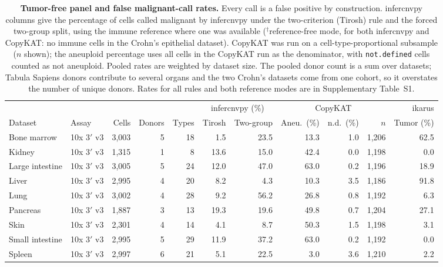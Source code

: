 \begin{table}[htbp]
\centering
\caption{\textbf{Tumor-free panel and false malignant-call rates.} Every call is a false positive by construction. infercnvpy columns give the percentage of cells called malignant by infercnvpy under the two-criterion (Tirosh) rule and the forced two-group split, using the immune reference where one was available ($^{\dagger}$reference-free mode, for both infercnvpy and CopyKAT: no immune cells in the Crohn's epithelial dataset). CopyKAT was run on a cell-type-proportional subsample ($n$ shown); the aneuploid percentage uses all cells in the CopyKAT run as the denominator, with \texttt{not.defined} cells counted as not aneuploid. Pooled rates are weighted by dataset size. The pooled donor count is a sum over datasets; Tabula Sapiens donors contribute to several organs and the two Crohn's datasets come from one cohort, so it overstates the number of unique donors. Rates for all rules and both reference modes are in Supplementary Table~S1.}
\label{tab:panel}
\scriptsize
\setlength{\tabcolsep}{3.2pt}
\begin{tabular}{@{}llrrrrrrrrr@{}}
\toprule
 & & & & & \multicolumn{2}{c}{infercnvpy (\%)} & \multicolumn{3}{c}{CopyKAT} & ikarus \\
\cmidrule(lr){6-7}\cmidrule(lr){8-10}\cmidrule(lr){11-11}
Dataset & Assay & Cells & Donors & Types & Tirosh & Two-group & Aneu.\ (\%) & n.d.\ (\%) & $n$ & Tumor (\%) \\
\midrule
Bone marrow & 10x 3$'$ v3 & 3,003 & 5 & 18 & 1.5 & 23.5 & 13.3 & 1.0 & 1,206 & 62.5 \\
Kidney & 10x 3$'$ v3 & 1,315 & 1 & 8 & 13.6 & 15.0 & 42.4 & 0.0 & 1,198 & 0.0 \\
Large intestine & 10x 3$'$ v3 & 3,005 & 5 & 24 & 12.0 & 47.0 & 63.0 & 0.2 & 1,196 & 18.9 \\
Liver & 10x 3$'$ v3 & 2,995 & 4 & 20 & 8.2 & 4.3 & 10.3 & 3.5 & 1,186 & 91.8 \\
Lung & 10x 3$'$ v3 & 3,002 & 4 & 28 & 9.2 & 56.2 & 26.8 & 0.8 & 1,192 & 6.3 \\
Pancreas & 10x 3$'$ v3 & 1,887 & 3 & 13 & 19.3 & 19.6 & 49.8 & 0.7 & 1,204 & 27.1 \\
Skin & 10x 3$'$ v3 & 2,301 & 4 & 14 & 4.1 & 8.7 & 50.3 & 1.5 & 1,198 & 3.1 \\
Small intestine & 10x 3$'$ v3 & 2,995 & 5 & 29 & 11.9 & 37.2 & 63.0 & 0.2 & 1,192 & 0.0 \\
Spleen & 10x 3$'$ v3 & 2,997 & 6 & 21 & 5.1 & 22.5 & 3.0 & 3.6 & 1,210 & 2.2 \\

\end{tabular}
\end{table}
